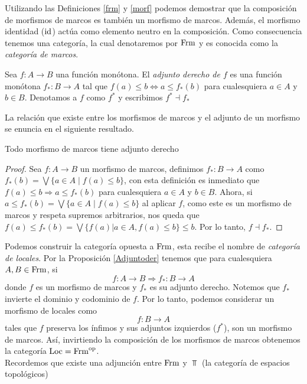 Utilizando las Definiciones \ref{frm} y \ref{morf} podemos demostrar que la composición de morfismos de marcos es también un morfismo de marcos. Además, el morfismo identidad ($\mathrm{id}$) actúa como elemento neutro en la composición. Como consecuencia tenemos una categoría, la cual denotaremos por $\mathrm{Frm}$ y es conocida como la \emph{categoría de marcos}.

\begin{dfn}\label{adjder}
Sea $f:A\to B$ una función monótona. El \emph{adjunto derecho de $f$} es una función monótona $f_*:B\to A$ tal que $f(a)\leq b\Leftrightarrow a\leq f_*(b)$ para cualesquiera $a\in A$ y $b\in B$. Denotamos a $f$ como $f^*$ y escribimos \emph{$f^*\dashv f_*$}
\end{dfn}

La relación que existe entre los morfismos de marcos y el adjunto de un morfismo se enuncia en el siguiente resultado.

\begin{prop}\label{Adjuntoder}
Todo morfismo de marcos tiene adjunto derecho
\end{prop}

\begin{proof}
Sea $f\colon A\rightarrow B$ un morfismo de marcos, definimos $f_{*}\colon B\to A$ como $f_{*}(b)=\bigvee\{a\in A\mid f(a)\leq b\}$, con esta definición es inmediato que $f(a)\leq b\Rightarrow a\leq f_{*}(b)$ para cualesquiera $a\in A$ y $b\in B$. Ahora, si $a\leq f_{*}(b)=\bigvee \{a\in A\mid f(a)\leq b\}$ al aplicar $f$, como este es un morfismo de marcos y respeta supremos arbitrarios, nos queda que $f(a)\leq f_{*}(b)=\bigvee \{f(a)|a\in A, f(a)\leq b\}\leq b$. Por lo tanto, $f\dashv f_{*}$.
\end{proof}

Podemos construir la categoría opuesta a $\mathrm{Frm}$, esta recibe el nombre de \emph{categoría de locales}. Por la Proposición \ref{Adjuntoder} tenemos que para cualesquiera $A, B\in \mathrm{Frm}$, si
\[
f\colon A\rightarrow B \Longrightarrow f_*\colon B\rightarrow A
\]
donde $f$ es un morfismo de marcos y $f_*$ es su adjunto derecho. Notemos que $f_*$ invierte el dominio y codominio de $f$. Por lo tanto, podemos considerar un morfismo de locales como 
\[
f\colon B\rightarrow A 
\]
tales que $f$ preserva los ínfimos y sus adjuntos izquierdos ($f^*$), son un morfismo de marcos. Así, invirtiendo la composición de los morfismos de marcos obtenemos la categoría $\mathrm{Loc}=\mathrm{Frm}^{\mathrm{op}}$.\\

Recordemos que existe una adjunción entre $\mathrm{Frm}$ y $\Top$ (la categoría de espacios topológicos)

